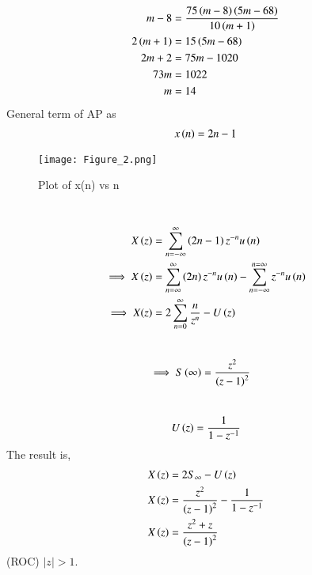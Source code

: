 \documentclass[journal,12pt,twocolumn]{IEEEtran}
\theoremstyle{remark}
\begin{document}
 \begin{align}
    m-8&=\frac{75\left(m-8\right)\left(5m-68\right)}{10\left(m+1\right)}\\
    2\left(m+1\right)&=15\left(5m-68\right)\\
    2m+2&=75m-1020\\
    73m&=1022\\
    m&=14
 \end{align}
General term of AP as 
\begin{align}
    x\left(n\right)=2n-1
\end{align}
\begin{figure}[!h]
    \centering
    \texttt{[image: Figure\_2.png]}
    \caption{Plot of x(n) vs n}
    \label{fig:1}
\end{figure}
\\
\begin{align}
    X\left(z\right)&=\sum_{n=-\infty}^{\infty}\left(2n-1\right)z^{-n}u\left(n\right) \\ \implies X\left(z\right)&=\sum_{n=\infty}^{\infty}\left(2n\right)z^{-n}u\left(n\right) -\sum_{n=-\infty}^{n=\infty}z^{-n}u\left(n\right)\\
   \implies X(z)&=2\sum_{n=0}^{\infty}\dfrac{n}{z^{n}}-U\left(z\right)
\end{align}
\\
\begin{align}
   \implies S\left(\infty\right)&=\dfrac{z^2}{\left(z-1\right)^{2}}
\end{align}
\\
\begin{align}
   U\left(z\right)=\dfrac{1}{1-z^{-1}}
\end{align}
The result is,
\begin{align}
    X\left(z\right)&=2S_\infty-U\left(z\right)\\
    X\left(z\right)&=\dfrac{z^2}{\left(z-1\right)^{2}}-\dfrac{1}{1-z^{-1}}\\
    X\left(z\right)&=\dfrac{z^2+z}{\left(z-1\right)^{2}}
\end{align}
(ROC) \(|z| > 1\).\\
\end{document}
